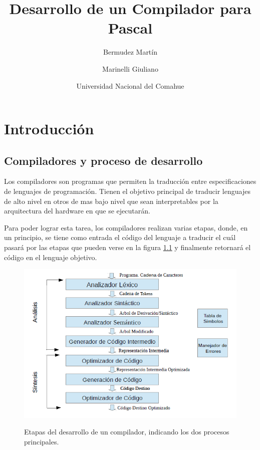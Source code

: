 \documentclass[a4paper]{report}
\begin{document}
\title{Desarrollo de un Compilador para Pascal}
\author{Bermudez Martín \and Marinelli Giuliano}
\date{Universidad Nacional del Comahue}



\tableofcontents
\thispagestyle{empty}


\chapter{Introducción}

\section{Compiladores y proceso de desarrollo}
Los compiladores son programas que permiten la traducción entre especificaciones de lenguajes de programación. Tienen el objetivo principal de traducir lenguajes de alto nivel en otros de mas bajo nivel que sean interpretables por la arquitectura del hardware en que se ejecutarán.

Para poder lograr esta tarea, los compiladores realizan varias etapas, donde, en un principio, se tiene como entrada el código del lenguaje a traducir el cuál pasará por las etapas que pueden verse en la figura \ref{fig:etapas} y finalmente retornará el código en el lenguaje objetivo.

\begin{figure}[H]
\centering
\resizebox{10cm}{!} {
\includegraphics{img/etapas_compilador.png}
}
\caption{Etapas del desarrollo de un compilador, indicando los dos procesos principales.}
\label{fig:etapas}
\end{figure}
\end{document}
